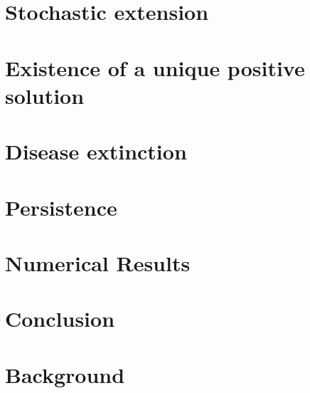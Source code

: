\documentclass[smallextended]{svjour3}
\begin{document}
	\section{Stochastic extension}
		
	\section{Existence of a unique positive solution}
		\label{sec:solution_existence}
		
	\section{Disease extinction}
		\label{extinction}
		
		
	\section{Persistence}
		\label{sec:persistence}
		
		
	\section{Numerical Results}
		\label{sec:numerics}
		
	\section{Conclusion}
		\label{sec:conclusion}
	\appendix
	\section{Background}
\end{document}
